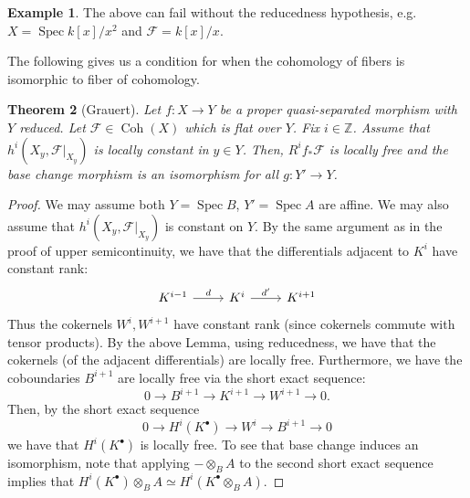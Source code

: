 \documentclass[10pt]{article}
\newtheorem{thm}{Theorem}[section]
\newtheorem{lemma}[thm]{Lemma}
\theoremstyle{definition}
\newtheorem{exmp}[thm]{Example}
\DeclareMathOperator{\Coh}{Coh}
\DeclareMathOperator{\Spec}{Spec}
\newcommand{\Z}{\mathbb{Z}}
\begin{document}
\begin{exmp}
The above can fail without the reducedness hypothesis, e.g. $X = \Spec k[x]/x^2$ and $\mathcal{F} = k[x]/x$.
\end{exmp}
%


The following gives us a condition for when the cohomology of fibers is isomorphic to fiber of cohomology.  
\begin{thm}[Grauert]
Let $f: X \rightarrow Y$ be a proper quasi-separated morphism with $Y$ reduced.  Let $\mathcal{F} \in \Coh(X)$ which is flat over $Y$.  Fix $i \in \Z$.  Assume that  $h^i(X_y, \mathcal{F}|_{X_y})$ is locally constant in $y \in Y$.  Then, $R^if_*\mathcal{F}$ is locally free and the base change morphism is an isomorphism for all $g: Y' \rightarrow Y$.
\end{thm}
\begin{proof}
We may assume both $Y = \Spec B$, $Y' = \Spec A$ are affine.  We may also assume that $h^i(X_y, \mathcal{F}|_{X_y})$ is constant on $Y$.  By the same argument as in the proof of upper semicontinuity, we have that the differentials adjacent to $K^i$ have constant rank:
$$\begin{tikzcd}
K^{i-1} \arrow[r, "d"] & K^i \arrow[r, "d'"] & K^{i+1} 
\end{tikzcd}$$
Thus the cokernels $W^i, W^{i+1}$ have constant rank (since cokernels commute with tensor products).  By the above Lemma, using reducedness, we have that the cokernels (of the adjacent differentials) are locally free.  Furthermore, we have the coboundaries $B^{i+1}$ are locally free via the short exact sequence:
$$0 \rightarrow B^{i+1} \rightarrow K^{i+1} \rightarrow W^{i+1} \rightarrow 0.$$
Then, by the short exact sequence
$$0 \rightarrow H^i(K^\bullet) \rightarrow W^i \rightarrow B^{i+1} \rightarrow 0$$
we have that $H^i(K^\bullet)$ is locally free.  To see that base change induces an isomorphism, note that applying $- \otimes_B A$ to the second short exact sequence implies that $H^i(K^\bullet) \otimes_B A \simeq H^i(K^\bullet \otimes_B A)$.
\end{proof}
\end{document}
